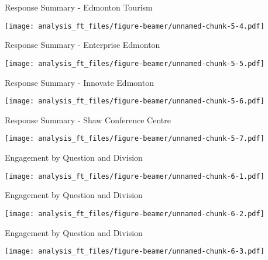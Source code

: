 \documentclass[handout]{beamer}
\begin{document}
\begin{frame}{Response Summary - Edmonton Tourism}
\protect\hypertarget{response-summary---edmonton-tourism}{}

\texttt{[image: analysis\_ft\_files/figure-beamer/unnamed-chunk-5-4.pdf]}

\end{frame}

\begin{frame}{Response Summary - Enterprise Edmonton}
\protect\hypertarget{response-summary---enterprise-edmonton}{}

\texttt{[image: analysis\_ft\_files/figure-beamer/unnamed-chunk-5-5.pdf]}

\end{frame}

\begin{frame}{Response Summary - Innovate Edmonton}
\protect\hypertarget{response-summary---innovate-edmonton}{}

\texttt{[image: analysis\_ft\_files/figure-beamer/unnamed-chunk-5-6.pdf]}

\end{frame}

\begin{frame}{Response Summary - Shaw Conference Centre}
\protect\hypertarget{response-summary---shaw-conference-centre}{}

\texttt{[image: analysis\_ft\_files/figure-beamer/unnamed-chunk-5-7.pdf]}

\end{frame}

\begin{frame}{Engagement by Question and Division}
\protect\hypertarget{engagement-by-question-and-division}{}

\texttt{[image: analysis\_ft\_files/figure-beamer/unnamed-chunk-6-1.pdf]}

\end{frame}

\begin{frame}{Engagement by Question and Division}
\protect\hypertarget{engagement-by-question-and-division-1}{}

\texttt{[image: analysis\_ft\_files/figure-beamer/unnamed-chunk-6-2.pdf]}

\end{frame}

\begin{frame}{Engagement by Question and Division}
\protect\hypertarget{engagement-by-question-and-division-2}{}

\texttt{[image: analysis\_ft\_files/figure-beamer/unnamed-chunk-6-3.pdf]}

\end{frame}
\end{document}
